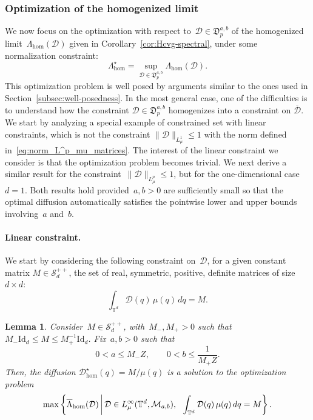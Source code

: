 \documentclass{article}
\newtheorem{lemma}{Lemma}
\newcommand{\Id}{\mathrm{Id}}
\renewcommand{\leq}{\leqslant}
\def\T{\mathbb{T}}
\newcommand{\Diff}{\mathcal{D}}
\newcommand{\Diffset}{\mathfrak{D}}
\renewcommand{\dim}{d}
\begin{document}
\subsubsection{Optimization of the homogenized limit} 
\label{sec:optimization_homog_lim}

We now focus on the optimization with respect to~$\Diff \in \Diffset_p^{a,b}$ of the homogenized limit~$\Lambda_{\mathrm{hom}}({\Diff})$ given in Corollary~\ref{cor:Hcvg-spectral}, under some normalization constraint:
\begin{equation}
  \label{eq:optim-homog-def}
  \Lambda_{\mathrm{hom}}^\star = \sup_{\Diff \in \Diffset_p^{a,b}}\Lambda_{\mathrm{hom}}(\Diff).
\end{equation}
This optimization problem is well posed by arguments similar to the ones used in Section~\ref{subsec:well-posedness}. In the most general case, one of the difficulties is to understand how the constraint $\Diff \in \Diffset_p^{a,b}$ homogenizes into a constraint on $\overline{\Diff}$. We start by analyzing a special example of constrained set with linear constraints, which is not the constraint $\| \Diff \|_{L^1_\mu} \leq 1$ with the norm defined in~\eqref{eq:norm_L^p_mu_matrices}. The interest of the linear constraint we consider is that the optimization problem becomes trivial. We next derive a similar result for the constraint~$\| \Diff \|_{L^p_\mu} \leq 1$, but for the one-dimensional case~$\dim=1$. Both results hold provided~$a,b>0$ are sufficiently small so that the optimal diffusion automatically satisfies the pointwise lower and upper bounds involving~$a$ and~$b$.

\paragraph{Linear constraint.} We start by considering the following constraint on~$\Diff$, for a given constant matrix $M\in\mathcal{S}_\dim^{++}$, the set of real, symmetric, positive, definite matrices of size~$\dim \times \dim$:
\begin{equation}
  \label{eq:linear-constraint}
  \int_{\T^\dim}\Diff(q) \, \mu(q) \, dq = M.
\end{equation}

\begin{lemma}
  Consider~$M\in\mathcal{S}_\dim^{++}$, with~$M_-,M_+ > 0$ such that~$M_- \Id_\dim \leq M \leq M_+^{-1} \Id_\dim$. Fix~$a,b > 0$ such that
  \begin{equation}
    \label{eq:bounds_a_b_linear_constraint}
    0 < a \leq M_- Z, \qquad 0 < b \leq \frac{1}{M_+ Z}.
  \end{equation}
  Then, the diffusion $\Diff^\star_\mathrm{hom}(q) = M/\mu(q)$ is a solution to the optimization problem
  \[
  \max \left\{ \overline{\Lambda}_{\rm{hom}}(\Diff)\, \middle| \, \Diff\in L_\mu^{\infty}(\T^\dim,\mathcal{M}_{a,b}), \ \ \int_{\T^\dim}\Diff(q) \, \mu(q) \, dq = M \right\}.
  \]
\end{lemma}
\end{document}
